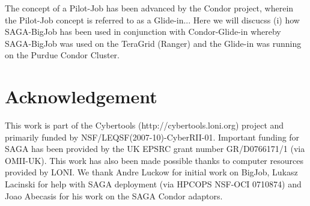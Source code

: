 \documentclass[conference,final]{IEEEtran}
\begin{document}

The concept of a Pilot-Job has been advanced by the Condor project, wherein the Pilot-Job concept is referred to as a Glide-in...  Here we will discucss (i) how SAGA-BigJob has been used in conjunction with Condor-Glide-in whereby SAGA-BigJob was used on the TeraGrid (Ranger) and the Glide-in was running on the Purdue Condor Cluster.



\section*{Acknowledgement}
This work is part of the Cybertools (http://cybertools.loni.org) project and primarily funded by NSF/LEQSF(2007-10)-CyberRII-01. Important funding for SAGA has been provided by the UK EPSRC grant number GR/D0766171/1 (via OMII-UK).  This work has also been made possible thanks to computer resources provided by LONI.  We thank Andre Luckow for initial work on BigJob, Lukasz Lacinski for help with SAGA deployment (via HPCOPS NSF-OCI 0710874) and Joao Abecasis for his work on the SAGA Condor adaptors.

\nocite{ex1,ex2}
%


\end{document}
